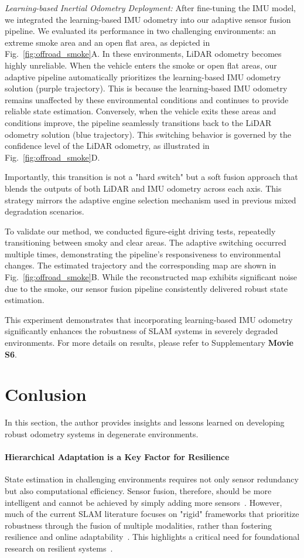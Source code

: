 \textit{Learning-based Inertial Odometry Deployment: } 
After fine-tuning the IMU model, we integrated the learning-based IMU odometry into our adaptive sensor fusion pipeline. We evaluated its performance in two challenging environments: an extreme smoke area and an open flat area, as depicted in Fig.~\ref{fig:offroad_smoke}A. In these environments, LiDAR odometry becomes highly unreliable. When the vehicle enters the smoke or open flat areas, our adaptive pipeline automatically prioritizes the learning-based IMU odometry solution (purple trajectory). This is because the learning-based IMU odometry remains unaffected by these environmental conditions and continues to provide reliable state estimation. Conversely, when the vehicle exits these areas and conditions improve, the pipeline seamlessly transitions back to the LiDAR odometry solution (blue trajectory). This switching behavior is governed by the confidence level of the LiDAR odometry, as illustrated in Fig.~\ref{fig:offroad_smoke}D.

Importantly, this transition is not a "hard switch" but a soft fusion approach that blends the outputs of both LiDAR and IMU odometry across each axis. This strategy mirrors the adaptive engine selection mechanism used in previous mixed degradation scenarios.


To validate our method, we conducted figure-eight driving tests, repeatedly transitioning between smoky and clear areas. The adaptive switching occurred multiple times, demonstrating the pipeline's responsiveness to environmental changes. The estimated trajectory and the corresponding map are shown in Fig.~\ref{fig:offroad_smoke}B. While the reconstructed map exhibits significant noise due to the smoke, our sensor fusion pipeline consistently delivered robust state estimation.

This experiment demonstrates that incorporating learning-based IMU odometry significantly enhances the robustness of SLAM systems in severely degraded environments. For more details on results, please refer to Supplementary \textbf{Movie S6}.


\section{Conlusion}
In this section, the author provides insights and lessons learned on developing robust odometry systems in degenerate environments.

\paragraph{Hierarchical Adaptation is a Key Factor for Resilience} State estimation in challenging environments requires not only sensor redundancy but also computational efficiency. Sensor fusion, therefore, should be more intelligent and cannot be achieved by simply adding more sensors~\cite{ebadi2021dare}. However, much of the current SLAM literature focuses on "rigid" frameworks that prioritize robustness through the fusion of multiple modalities, rather than fostering resilience and online adaptability~\cite{prorok2021beyond}. This highlights a critical need for foundational research on resilient systems~\cite{ebadi2023present}.

